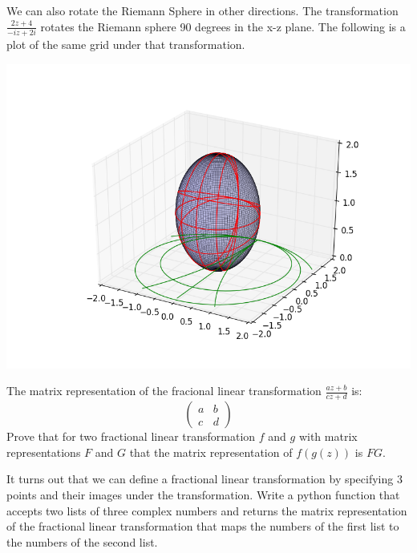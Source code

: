 We can also rotate the Riemann Sphere in other directions. The transformation $\frac{2z+4}{-iz+2i}$ rotates the Riemann sphere 90 degrees in the x-z plane. The following is a plot of the same grid under that transformation.

\includegraphics[width=\textwidth]{mobius5.png}

\begin{problem}
The matrix representation of the fracional linear transformation $\frac{az+b}{cz+d}$ is:
\[
\begin{pmatrix}
a&b\\
c&d
\end{pmatrix}
\]
Prove that for two fractional linear transformation $f$ and $g$ with matrix representations $F$ and $G$ that the matrix representation of $f(g(z))$ is $FG$.
\end{problem}

\begin{problem}
It turns out that we can define a fractional linear transformation by specifying 3 points and their images under the transformation.
Write a python function that accepts two lists of three complex numbers and returns the matrix representation of the fractional linear transformation that maps the numbers of the first list to the numbers of the second list.
\end{problem}
